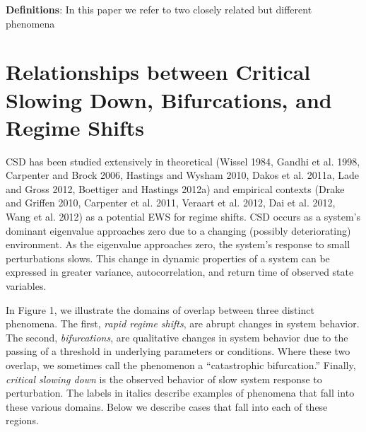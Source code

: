 \documentclass{article}
\begin{document}
\textbf{Definitions}: In this paper we refer to two closely related but
different phenomena

\section{Relationships between Critical Slowing Down, Bifurcations, and
Regime Shifts}

CSD has been studied extensively in theoretical (Wissel 1984, Gandhi et
al. 1998, Carpenter and Brock 2006, Hastings and Wysham 2010, Dakos et
al. 2011a, Lade and Gross 2012, Boettiger and Hastings 2012a) and
empirical contexts (Drake and Griffen 2010, Carpenter et al. 2011,
Veraart et al. 2012, Dai et al. 2012, Wang et al. 2012) as a potential
EWS for regime shifts. CSD occurs as a system's dominant eigenvalue
approaches zero due to a changing (possibly deteriorating) environment.
As the eigenvalue approaches zero, the system's response to small
perturbations slows. This change in dynamic properties of a system can
be expressed in greater variance, autocorrelation, and return time of
observed state variables.

In Figure 1, we illustrate the domains of overlap between three distinct
phenomena. The first, \emph{rapid regime shifts}, are abrupt changes in
system behavior. The second, \emph{bifurcations}, are qualitative
changes in system behavior due to the passing of a threshold in
underlying parameters or conditions. Where these two overlap, we
sometimes call the phenomenon a ``catastrophic bifurcation.'' Finally,
\emph{critical slowing down} is the observed behavior of slow system
response to perturbation. The labels in italics describe examples of
phenomena that fall into these various domains. Below we describe cases
that fall into each of these regions.
\end{document}
